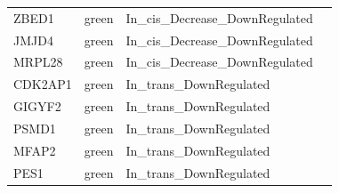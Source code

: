 \begin{table}[htbp]
\begin{tabular}{|l|l|l|r}
     ZBED1 & green & In\_cis\_Decrease\_DownRegulated   \\
     JMJD4 & green & In\_cis\_Decrease\_DownRegulated   \\
     MRPL28 & green & In\_cis\_Decrease\_DownRegulated   \\
     CDK2AP1 & green & In\_trans\_DownRegulated   \\
     GIGYF2 & green & In\_trans\_DownRegulated   \\
     PSMD1 & green & In\_trans\_DownRegulated   \\
     MFAP2 & green & In\_trans\_DownRegulated   \\
     PES1 & green & In\_trans\_DownRegulated   \\
     \hline
     \end{tabular}%
   \label{tab:SA609downrregulatedgenesinclusters}%
 \end{table}%
 
